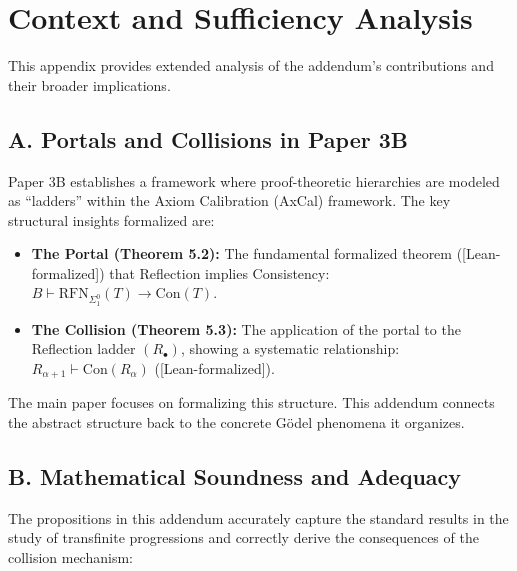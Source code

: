 \documentclass[11pt]{article}
\newcommand{\Con}{\mathrm{Con}}
\newcommand{\RFNSigOne}{\mathrm{RFN}_{\Sigma^0_1}}
\newcommand{\leanok}{\textsf{\textcolor{green!70!black}{[Lean-formalized]}}}
\begin{document}

\appendix

\section{Context and Sufficiency Analysis}

This appendix provides extended analysis of the addendum's contributions and their broader implications.

\subsection{A. Portals and Collisions in Paper 3B}

Paper 3B establishes a framework where proof-theoretic hierarchies are modeled as ``ladders'' within the Axiom Calibration (AxCal) framework. The key structural insights formalized are:

\begin{itemize}
\item \textbf{The Portal (Theorem 5.2):} The fundamental formalized theorem (\leanok) that Reflection implies Consistency: $B \vdash \RFNSigOne(T) \to \Con(T)$.
\item \textbf{The Collision (Theorem 5.3):} The application of the portal to the Reflection ladder $(R_\bullet)$, showing a systematic relationship: $R_{\alpha+1} \vdash \Con(R_\alpha)$ (\leanok).
\end{itemize}

The main paper focuses on formalizing this structure. This addendum connects the abstract structure back to the concrete Gödel phenomena it organizes.

\subsection{B. Mathematical Soundness and Adequacy}

The propositions in this addendum accurately capture the standard results in the study of transfinite progressions and correctly derive the consequences of the collision mechanism:
\end{document}
